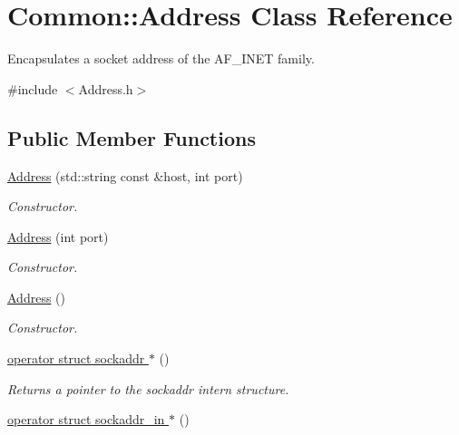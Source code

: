 \hypertarget{class_common_1_1_address}{\section{Common\-:\-:Address Class Reference}
\label{class_common_1_1_address}
}


Encapsulates a socket address of the A\-F\-\_\-\-I\-N\-E\-T family.  




{\ttfamily \#include $<$Address.\-h$>$}

\subsection*{Public Member Functions}
\begin{DoxyCompactItemize}
\item 
\hyperlink{class_common_1_1_address_a94cc0e4607b6124a926cb1f27792cf62}{Address} (std\-::string const \&host, int port)
\begin{DoxyCompactList}\small\item\em Constructor. \end{DoxyCompactList}\item 
\hyperlink{class_common_1_1_address_a4dc926540c01072ed3a064623a135341}{Address} (int port)
\begin{DoxyCompactList}\small\item\em Constructor. \end{DoxyCompactList}\item 
\hyperlink{class_common_1_1_address_a63f910c09d93bdd16d3744e47d13dc0e}{Address} ()
\begin{DoxyCompactList}\small\item\em Constructor. \end{DoxyCompactList}\item 
\hypertarget{class_common_1_1_address_ac763a8750a054f589297f6a2994fdd16}{\hyperlink{class_common_1_1_address_ac763a8750a054f589297f6a2994fdd16}{operator struct sockaddr $\ast$} ()}\label{class_common_1_1_address_ac763a8750a054f589297f6a2994fdd16}

\begin{DoxyCompactList}\small\item\em Returns a pointer to the sockaddr intern structure. \end{DoxyCompactList}\item 
\hypertarget{class_common_1_1_address_a16f9cd6303d3c150c1a040b043f4897f}{\hyperlink{class_common_1_1_address_a16f9cd6303d3c150c1a040b043f4897f}{operator struct sockaddr\-\_\-in $\ast$} ()}\label{class_common_1_1_address_a16f9cd6303d3c150c1a040b043f4897f}


\end{DoxyCompactItemize}
